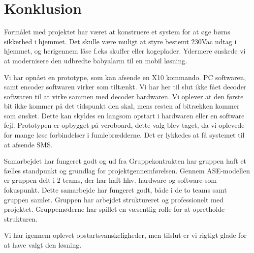 \chapter{Konklusion}

Formålet med projektet har været at konstruere et system for at øge børns sikkerhed i hjemmet. Det skulle være muligt at styre bestemt 230Vac udtag i hjemmet, og herigennem låse f.eks skuffer eller kogeplader. Ydermere ønskede vi at modernisere den udbredte babyalarm til en mobil løsning. 

Vi har opnået en prototype, som kan afsende en X10 kommando. PC softwaren, samt encoder softwaren virker som tiltænkt. Vi har her til slut ikke fået decoder softwaren til at virke sammen med decoder hardwaren. Vi oplever at den første bit ikke kommer på det tidspunkt den skal, mens resten af bitrækken kommer som ønsket. Dette kan skyldes en langsom opstart i hardwaren eller en software fejl. Prototypen er opbygget på veroboard, dette valg blev taget, da vi oplevede for mange løse forbindelser i fumlebrædderne. 
Det er lykkedes at få systemet til at afsende SMS.  

Samarbejdet har fungeret godt og ud fra Gruppekontrakten har gruppen haft et fælles standpunkt og grundlag for projektgennemførelsen. Gennem ASE-modellen er gruppen delt i 2 teams, der har haft hhv. hardware og software som fokuspunkt. Dette samarbejde har fungeret godt, både i de to teams samt gruppen samlet. Gruppen har arbejdet struktureret og professionelt med projektet. Gruppemøderne har spillet en væsentlig rolle for at opretholde strukturen.  

Vi har igennem \Latex oplevet opstartsvanskeligheder, men tilslut er vi rigtigt glade for at have valgt den løsning. 
